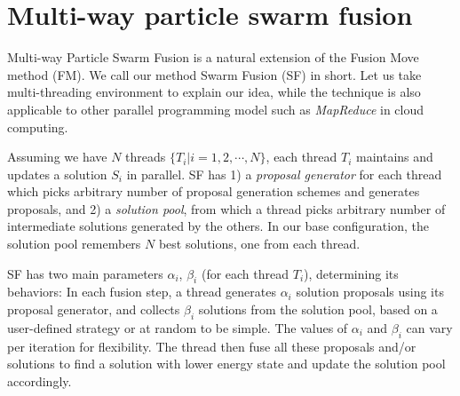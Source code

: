 \section{Multi-way particle swarm fusion} \label{section:algorithm}
Multi-way Particle Swarm Fusion is a natural extension of the Fusion
Move method (FM). We call our method Swarm Fusion (SF) in short. Let us
take multi-threading environment to explain our idea, while the
technique is also applicable to other parallel programming model such as
{\it MapReduce} in cloud computing.
%

Assuming we have $N$ threads $\{T_i | i=1, 2, \cdots, N\}$,
each thread $T_i$ maintains and updates a solution $S_i$ in
parallel.
SF has 1) a {\it proposal generator} for each thread which picks
arbitrary number of proposal generation schemes and generates proposals,
and 2) a {\it solution pool}, from which a thread picks arbitrary number
of intermediate solutions generated by the others.
%
%
In our base configuration, the solution pool remembers $N$ best
solutions, one from each thread.

SF has two main parameters $\alpha_i$, $\beta_i$ (for each thread
$T_i$), determining its behaviors: In each fusion step, a thread
generates $\alpha_i$ solution proposals using its proposal generator, and collects
$\beta_i$ solutions from the solution pool, based on a user-defined
strategy or at random to be simple. The values of $\alpha_i$ and
$\beta_i$ can vary per iteration for flexibility.
The thread then fuse all these proposals and/or solutions to find a solution
with lower energy state and update the solution pool accordingly.
%



